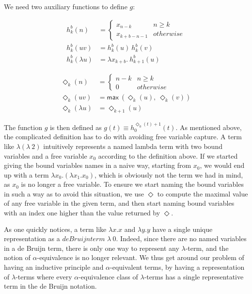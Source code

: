 \documentclass[a4paper, 12pt, twoside]{style/ociamthesis}
\renewcommand{\max}{\textsf{max}\ }
\begin{document}
We need two auxiliary functions to define \(g\):

\begin{align*} 
h_k^b(n) &= \begin{cases}
x_{n-k} & n \geq k\\
x_{k+b-n-1} & otherwise
\end{cases}\\
h_k^b(uv) &= h_k^b(u)\ h_k^b(v)\\
h_k^b(\lambda u) &= \lambda x_{k+b}.\ h_{k+1}^b(u)
\end{align*}

\begin{align*} 
\Diamond_k(n) &= \begin{cases}
n-k & n \geq k\\
0 & otherwise
\end{cases}\\
\Diamond_k(uv) &= \max (\Diamond_k(u),\ \Diamond_k(v))\\
\Diamond_k(\lambda u) &= \Diamond_{k+1}(u)
\end{align*}

The function \(g\) is then defined as
\(g(t) \equiv h_0^{\Diamond_0(t)+1}(t)\). As mentioned above, the
complicated definition has to do with avoiding free variable capture. A
term like \(\lambda (\lambda\ 2)\) intuitively represents a named lambda
term with two bound variables and a free variable \(x_0\) according to
the definition above. If we started giving the bound variables names in
a naive way, starting from \(x_0\), we would end up with a term
\(\lambda x_0.(\lambda x_1.x_0)\), which is obviously not the term we
had in mind, as \(x_0\) is no longer a free variable. To ensure we start
naming the bound variables in such a way as to avoid this situation, we
use \(\Diamond\) to compute the maximal value of any free variable in
the given term, and then start naming bound variables with an index one
higher than the value returned by \(\Diamond\).

As one quickly notices, a term like \(\lambda x.x\) and \(\lambda y.y\)
have a single unique representation as a \(de Bruijn term\)
\(\lambda\ 0\). Indeed, since there are no named variables in a de
Bruijn term, there is only one way to represent any \(\lambda\)-term,
and the notion of \(\alpha\)-equivalence is no longer relevant. We thus
get around our problem of having an inductive principle and
\(\alpha\)-equivalent terms, by having a representation of
\(\lambda\)-terms where every \(\alpha\)-equivalence class of
\(\lambda\)-terms has a single representative term in the de Bruijn
notation.
\end{document}
